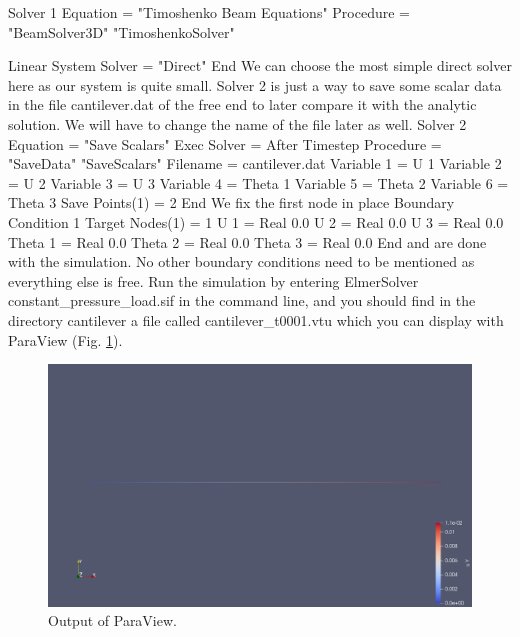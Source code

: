 Solver 1
  Equation = "Timoshenko Beam Equations"
  Procedure = "BeamSolver3D" "TimoshenkoSolver"

  Linear System Solver = "Direct"
End
\ttend 
We can choose the most simple direct solver here as our system is quite small. Solver 2 is just a way to save some scalar data in the file cantilever.dat of the free end to later compare it with the analytic solution. We will have to change the name of the file later as well.
\ttbegin
Solver 2
  Equation = "Save Scalars"
  Exec Solver = After Timestep
  Procedure = "SaveData" "SaveScalars"
  Filename = cantilever.dat
  Variable 1 = U 1
  Variable 2 = U 2
  Variable 3 = U 3
  Variable 4 = Theta 1
  Variable 5 = Theta 2
  Variable 6 = Theta 3
  Save Points(1) = 2
End
\ttend 
We fix the first node in place
\ttbegin
Boundary Condition 1
  Target Nodes(1) = 1
  U 1 = Real 0.0
  U 2 = Real 0.0
  U 3 = Real 0.0
  Theta 1 = Real 0.0
  Theta 2 = Real 0.0
  Theta 3 = Real 0.0
End
\ttend
and are done with the simulation. No other boundary conditions need to be mentioned as everything else is free. Run the simulation by entering 
\ttbegin
ElmerSolver constant_pressure_load.sif
\ttend 
in the command line, and you should find in the directory cantilever a file called cantilever\_t0001.vtu which you can display with ParaView (Fig. \ref{fig:timoshenko-paraview}). 
\begin{figure}[hbt]
  \centerline{\includegraphics[width=1.0\textwidth]{displacements-paraview.pdf}}
  \caption{Output of ParaView.} 
  \label{fig:timoshenko-paraview}
\end{figure}
